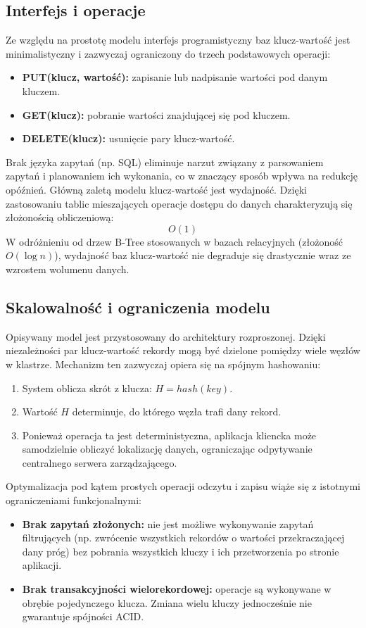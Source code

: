 \subsection{Interfejs i operacje}
Ze względu na prostotę modelu interfejs programistyczny baz klucz-wartość jest minimalistyczny i zazwyczaj ograniczony do trzech podstawowych operacji:
\begin{itemize}
    \item \textbf{PUT(klucz, wartość):} zapisanie lub nadpisanie wartości pod danym kluczem.
    \item \textbf{GET(klucz):} pobranie wartości znajdującej się pod kluczem.
    \item \textbf{DELETE(klucz):} usunięcie pary klucz-wartość.
\end{itemize}
Brak języka zapytań (np. SQL) eliminuje narzut związany z parsowaniem zapytań i planowaniem ich wykonania, co w znaczący sposób wpływa na redukcję opóźnień. Główną zaletą modelu klucz-wartość jest wydajność. Dzięki zastosowaniu tablic mieszających operacje dostępu do danych charakteryzują się złożonością obliczeniową:
\begin{equation}
    O(1)
\end{equation}
W odróżnieniu od drzew B-Tree stosowanych w bazach relacyjnych (złożoność $O(\log n)$), wydajność baz klucz-wartość nie degraduje się drastycznie wraz ze wzrostem wolumenu danych.
\subsection{Skalowalność i ograniczenia modelu}
Opisywany model jest przystosowany do architektury rozproszonej. Dzięki niezależności par klucz-wartość rekordy mogą być dzielone pomiędzy wiele węzłów w klastrze. Mechanizm ten zazwyczaj opiera się na spójnym hashowaniu:
\begin{enumerate}
    \item System oblicza skrót z klucza: $H = hash(key)$.
    \item Wartość $H$ determinuje, do którego węzła trafi dany rekord.
    \item Ponieważ operacja ta jest deterministyczna, aplikacja kliencka może samodzielnie obliczyć lokalizację danych, ograniczając odpytywanie centralnego serwera zarządzającego.
\end{enumerate}
Optymalizacja pod kątem prostych operacji odczytu i zapisu wiąże się z istotnymi ograniczeniami funkcjonalnymi:
\begin{itemize}
    \item \textbf{Brak zapytań złożonych:} nie jest możliwe wykonywanie zapytań filtrujących (np. zwrócenie wszystkich rekordów o wartości przekraczającej dany próg) bez pobrania wszystkich kluczy i ich przetworzenia po stronie aplikacji.
    \item \textbf{Brak transakcyjności wielorekordowej:} operacje są wykonywane w obrębie pojedynczego klucza. Zmiana wielu kluczy jednocześnie nie gwarantuje spójności ACID.
\end{itemize}
